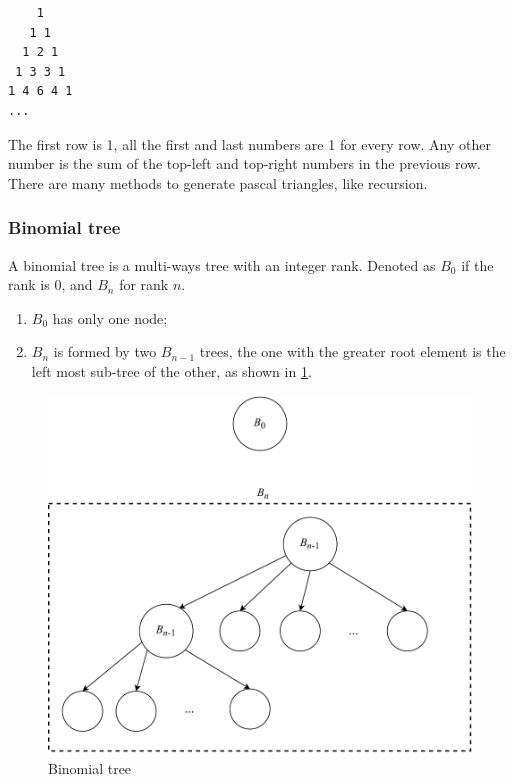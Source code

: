 \documentclass[b5paper]{article}
\begin{document}
\begin{verbatim}
    1
   1 1
  1 2 1
 1 3 3 1
1 4 6 4 1
...
\end{verbatim}

The first row is 1, all the first and last numbers are 1 for every row. Any other number is the sum of the top-left and top-right numbers in the previous row. There are many methods to generate pascal triangles, like recursion.

\subsubsection{Binomial tree}
\label{Binomial tree} 

A binomial tree is a multi-ways tree with an integer rank. Denoted as $B_0$ if the rank is 0, and $B_n$ for rank $n$.

\begin{enumerate}
\item $B_0$ has only one node;
\item $B_n$ is formed by two $B_{n-1}$ trees, the one with the greater root element is the left most sub-tree of the other, as shown in \cref{fig:link-bitree}.
\end{enumerate}

\begin{figure}[htbp]
  \centering
  \includegraphics[scale=0.5]{img/binomial-tree}
  \caption{Binomial tree}
  \label{fig:link-bitree}
\end{figure}
\end{document}
